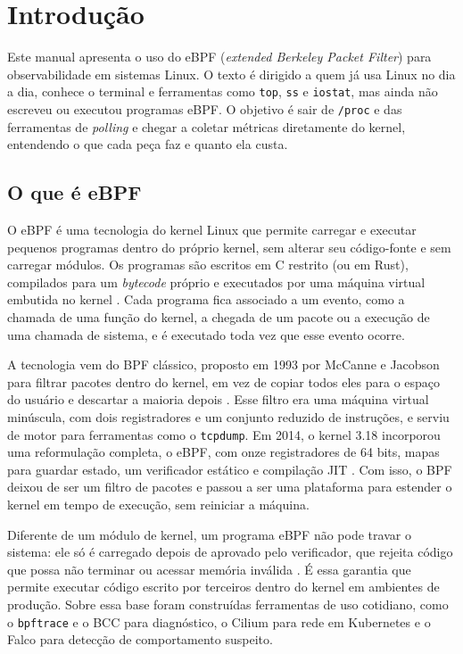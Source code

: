 \chapter{Introdução}\label{cap:introducao}

Este manual apresenta o uso do eBPF (\textit{extended Berkeley Packet Filter}) para observabilidade em sistemas Linux. O texto é dirigido a quem já usa Linux no dia a dia, conhece o terminal e ferramentas como \texttt{top}, \texttt{ss} e \texttt{iostat}, mas ainda não escreveu ou executou programas eBPF. O objetivo é sair de \texttt{/proc} e das ferramentas de \textit{polling} e chegar a coletar métricas diretamente do kernel, entendendo o que cada peça faz e quanto ela custa.

\section{O que é eBPF}

O eBPF é uma tecnologia do kernel Linux que permite carregar e executar pequenos programas dentro do próprio kernel, sem alterar seu código-fonte e sem carregar módulos. Os programas são escritos em C restrito (ou em Rust), compilados para um \textit{bytecode} próprio e executados por uma máquina virtual embutida no kernel \cite{gregg2019,linuxkernel2024}. Cada programa fica associado a um evento, como a chamada de uma função do kernel, a chegada de um pacote ou a execução de uma chamada de sistema, e é executado toda vez que esse evento ocorre.

A tecnologia vem do BPF clássico, proposto em 1993 por McCanne e Jacobson para filtrar pacotes dentro do kernel, em vez de copiar todos eles para o espaço do usuário e descartar a maioria depois \cite{mccanne1993}. Esse filtro era uma máquina virtual minúscula, com dois registradores e um conjunto reduzido de instruções, e serviu de motor para ferramentas como o \texttt{tcpdump}. Em 2014, o kernel 3.18 incorporou uma reformulação completa, o eBPF, com onze registradores de 64 bits, mapas para guardar estado, um verificador estático e compilação JIT \cite{gregg2019}. Com isso, o BPF deixou de ser um filtro de pacotes e passou a ser uma plataforma para estender o kernel em tempo de execução, sem reiniciar a máquina.

Diferente de um módulo de kernel, um programa eBPF não pode travar o sistema: ele só é carregado depois de aprovado pelo verificador, que rejeita código que possa não terminar ou acessar memória inválida \cite{linuxkernel2024}. É essa garantia que permite executar código escrito por terceiros dentro do kernel em ambientes de produção. Sobre essa base foram construídas ferramentas de uso cotidiano, como o \texttt{bpftrace} e o BCC para diagnóstico, o Cilium para rede em Kubernetes e o Falco para detecção de comportamento suspeito.

